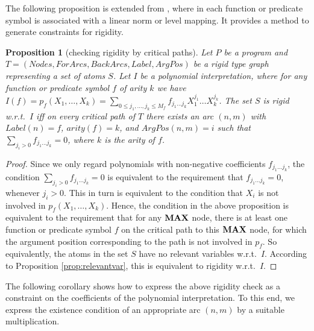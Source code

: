 \documentclass[envcountsame]{tlp}
\newcounter{ex:der-lastsymconsctr}
\newtheorem{proposition}{Proposition}
\begin{document}
The following proposition is extended from \cite{Decorteetal93}, where in
\cite{Decorteetal93} each function or predicate symbol is associated with a
linear norm or level mapping. It provides a method to generate 
constraints for rigidity.



\begin{proposition}[checking rigidity by critical paths]
\label{rigiditysyntax}
    Let $P$ be a program and $T = (\mathit{Nodes}, \mathit{ForArcs}, \mathit{BackArcs}, \mathit{Label}, \mathit{ArgPos})$ be
a rigid type graph representing a set of atoms $S$. Let
$I$ be a polynomial
interpretation, where for any function or predicate symbol $f$ of arity $k$ we
have $I(f) = p_f(X_1,\ldots,X_k) =
\sum_{0 \le j_1,\ldots,j_k \le M_f} f_{{j_1}\ldots{j_k}}X_1^{j_1} \ldots X_k^{j_k}$. 
The set $S$ is rigid w.r.t.\ $I$ iff 
on every critical path of $T$ there exists an arc $(n, m)$
with $\mathit{Label}(n) = f$, $\mathit{arity}(f) = k$, and $\mathit{ArgPos}(n,m) = i$ such that
$\sum_{j_i>0} f_{{j_1}\ldots{j_k}} = 0$, where $k$ is the arity of $f$.
\end{proposition}
\begin{proof}
Since we only regard polynomials with non-negative
coefficients
$f_{{j_1}\ldots{j_k}}$, 
the condition $\sum_{j_i>0} f_{{j_1}\ldots{j_k}} = 0$ 
is equivalent to the requirement that $f_{{j_1}\ldots{j_k}} = 0$, whenever
$j_i>0$. This in turn is equivalent to the condition that $X_i$ is not 
involved in $p_f(X_1,\ldots,X_k)$. Hence, the condition in the above proposition
is equivalent to the requirement that
for any $\mbox{\rm	\textbf{MAX}}$
node, there is at least one function or predicate symbol $f$ on the critical path to this
$\mbox{\rm	\textbf{MAX}}$ node, for 
which the argument position corresponding to the path is not involved in
$p_f$. So equivalently, the atoms in the set $S$ have no relevant variables
w.r.t.\ $I$.
According to Proposition \ref{prop:relevantvar}, this is equivalent to rigidity 
w.r.t.\ $I$.
\end{proof}



The following corollary shows how to express the above rigidity check as a
constraint on the coefficients of the polynomial interpretation. To this end,
we express the existence condition of an appropriate arc $(n, m)$
by a suitable multiplication.
\end{document}
